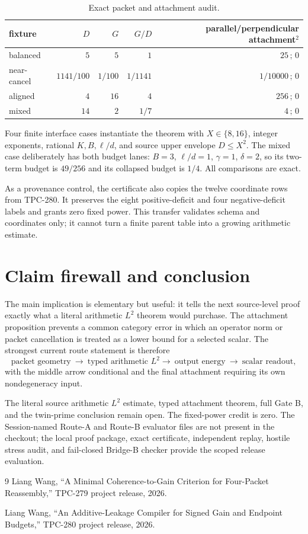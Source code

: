 \documentclass[11pt]{article}
\begin{document}
\begin{table}[ht]
\centering\small
\begin{tabular}{lrrrr}
\toprule
fixture & $D$ & $G$ & $G/D$ & parallel/perpendicular attachment$^2$\\
\midrule
balanced & $5$ & $5$ & $1$ & $25\,;\,0$\\
near-cancel & $1141/100$ & $1/100$ & $1/1141$ & $1/10000\,;\,0$\\
aligned & $4$ & $16$ & $4$ & $256\,;\,0$\\
mixed & $14$ & $2$ & $1/7$ & $4\,;\,0$\\
\bottomrule
\end{tabular}
\caption{Exact packet and attachment audit.}
\label{tab:packets}
\end{table}

Four finite interface cases instantiate the theorem with $X\in\{8,16\}$,
integer exponents, rational $K,B,\ell/d$, and source upper envelope
$D\le X^2$.  The mixed case deliberately has both budget lanes:
$B=3$, $\ell/d=1$, $\gamma=1$, $\delta=2$, so its two-term budget is
$49/256$ and its collapsed budget is $1/4$.  All comparisons are exact.

As a provenance control, the certificate also copies the twelve coordinate rows
from TPC-280.  It preserves the eight positive-deficit and four
negative-deficit labels and grants zero fixed power.  This transfer validates
schema and coordinates only; it cannot turn a finite parent table into a
growing arithmetic estimate.

\section{Claim firewall and conclusion}

The main implication is elementary but useful: it tells the next source-level
proof exactly what a literal arithmetic $L^2$ theorem would purchase.  The
attachment proposition prevents a common category error in which an operator
norm or packet cancellation is treated as a lower bound for a selected scalar.
The strongest current route statement is therefore
\[
 \text{packet geometry}\ \longrightarrow\ \text{typed arithmetic }L^2
 \longrightarrow\ \text{output energy}\ \longrightarrow\ \text{scalar readout},
\]
with the middle arrow conditional and the final attachment requiring its own
nondegeneracy input.

The literal source arithmetic $L^2$ estimate, typed attachment theorem, full
Gate B, and the twin-prime conclusion remain open.  The fixed-power credit is
zero.  The Session-named Route-A and Route-B evaluator files are not present in
the checkout; the local proof package, exact certificate, independent replay,
hostile stress audit, and fail-closed Bridge-B checker provide the scoped
release evaluation.

\begin{thebibliography}{9}
Liang Wang, ``A Minimal Coherence-to-Gain Criterion for Four-Packet
Reassembly,'' TPC-279 project release, 2026.

Liang Wang, ``An Additive-Leakage Compiler for Signed Gain and Endpoint
Budgets,'' TPC-280 project release, 2026.
\end{thebibliography}
\end{document}

